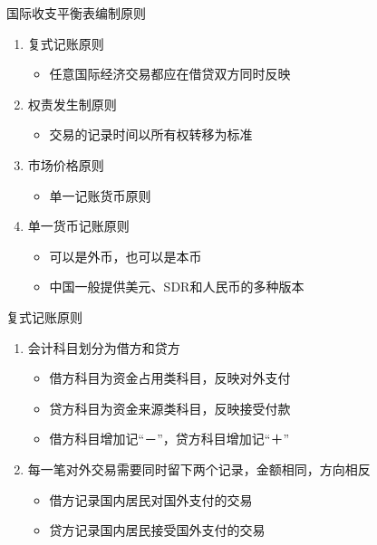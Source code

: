 \documentclass[10pt,hyperref={CJKbookmarks=true},xcolor=dvipsnames,aspectratio=169]{beamer}
\begin{document}
\begin{frame}{国际收支平衡表编制原则}
\begin{enumerate}
	\item 复式记账原则
	\begin{itemize}
		\item 任意国际经济交易都应在借贷双方同时反映
	\end{itemize}
	\item 权责发生制原则
	\begin{itemize}
		\item 交易的记录时间以所有权转移为标准
	\end{itemize}
	\item 市场价格原则
	\begin{itemize}
		\item 单一记账货币原则
	\end{itemize}
	\item 单一货币记账原则
	\begin{itemize}
		\item 可以是外币，也可以是本币
		\item 中国一般提供美元、SDR和人民币的多种版本
	\end{itemize}
\end{enumerate}
\end{frame}

\begin{frame}{复式记账原则}
\begin{enumerate}
	\item 会计科目划分为借方和贷方
		\begin{itemize}
		\item 借方科目为资金占用类科目，反映对外支付
		\item 贷方科目为资金来源类科目，反映接受付款
		\item 借方科目增加记“－”，贷方科目增加记“＋”
		\end{itemize}
	\item 每一笔对外交易需要同时留下两个记录，金额相同，方向相反
		\begin{itemize}
		\item 借方记录国内居民对国外支付的交易
		\item 贷方记录国内居民接受国外支付的交易
		\end{itemize}	
\end{enumerate}
\end{frame}
\end{document}

